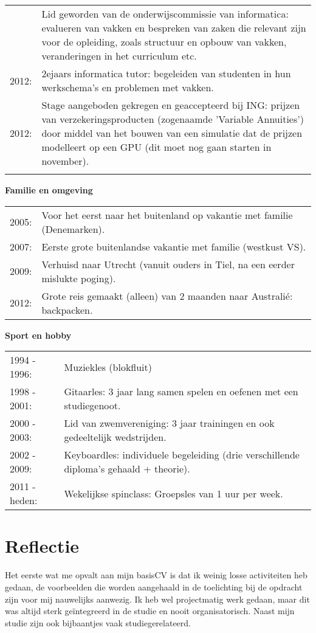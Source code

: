 \documentclass[11pt,a4paper,onecolumn]{article}
\begin{document}
\begin{longtable}{l l}
\begin{tabular}{p{} p{}}
    2011: & Lid geworden van de onderwijscommissie van informatica: evalueren van vakken en bespreken van zaken die relevant zijn voor de opleiding, zoals structuur en opbouw van vakken, veranderingen in het curriculum etc. \\
    2012: & 2ejaars informatica tutor: begeleiden van studenten in hun werkschema's en problemen met vakken.\\
    2012: & Stage aangeboden gekregen en geaccepteerd bij ING: prijzen van verzekeringsproducten (zogenaamde 'Variable Annuities') door middel van het bouwen van een simulatie dat de prijzen modelleert op een GPU (dit moet nog gaan starten in november). \\
  \end{tabular}
\end{longtable}

{\Large \textbf{Familie en omgeving} }
\begin{longtable}{l l}
  2005: & Voor het eerst naar het buitenland op vakantie met familie (Denemarken). \\
  2007: & Eerste grote buitenlandse vakantie met familie (westkust VS). \\
  2009: & Verhuisd naar Utrecht (vanuit ouders in Tiel, na een eerder mislukte poging). \\
  2012: & Grote reis gemaakt (alleen) van 2 maanden naar Australi\'e: backpacken. \\
\end{longtable}

{\Large \textbf{Sport en hobby} }
\begin{longtable}{l l}
  1994 - 1996: & Muziekles (blokfluit) \\
  1998 - 2001: & Gitaarles: 3 jaar lang samen spelen en oefenen met een studiegenoot. \\
  2000 - 2003: & Lid van zwemvereniging: 3 jaar trainingen en ook gedeeltelijk wedstrijden. \\
  2002 - 2009: & Keyboardles: individuele begeleiding (drie verschillende diploma's gehaald + theorie). \\
  2011 - heden: & Wekelijkse spinclass: Groepsles van 1 uur per week. \\
\end{longtable}

\section*{Reflectie}
Het eerste wat me opvalt aan mijn basisCV is dat ik weinig losse activiteiten heb gedaan, de voorbeelden die worden aangehaald in de toelichting bij de opdracht zijn voor mij nauwelijks aanwezig. Ik heb wel projectmatig werk gedaan, maar dit was altijd sterk ge\"integreerd in de studie en nooit organisatorisch. Naast mijn studie zijn ook bijbaantjes vaak studiegerelateerd.
\end{document}
